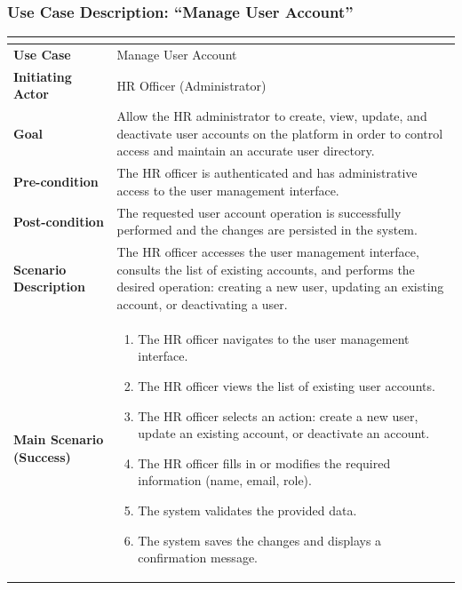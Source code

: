 \subsubsection{Use Case Description: ``Manage User Account''}

\setlength{\tabcolsep}{4pt}
\renewcommand{\arraystretch}{1.6}
\begin{table}[H]
\centering
\small
\begin{tabularx}{\textwidth}{|>{\bfseries\arraybackslash}p{4cm}|X|}
\hline
\rowcolor{headerblue}
\multicolumn{2}{|c|}{\textbf{Use Case: Manage User Account}} \\
\hline
Use Case            & Manage User Account \\
\hline
Initiating Actor    & HR Officer (Administrator) \\
\hline
Goal                & Allow the HR administrator to create, view, update, and deactivate user accounts on the platform in order to control access and maintain an accurate user directory. \\
\hline
Pre-condition       & The HR officer is authenticated and has administrative access to the user management interface. \\
\hline
Post-condition      & The requested user account operation is successfully performed and the changes are persisted in the system. \\
\hline
Scenario Description &
The HR officer accesses the user management interface, consults the list of existing accounts, and performs the desired operation: creating a new user, updating an existing account, or deactivating a user. \\
\hline
Main Scenario (Success) &
\begin{enumerate}[leftmargin=*, label=\arabic*., topsep=0pt, itemsep=0pt]
    \item The HR officer navigates to the user management interface.
    \item The HR officer views the list of existing user accounts.
    \item The HR officer selects an action: create a new user, update an existing account, or deactivate an account.
    \item The HR officer fills in or modifies the required information (name, email, role).
    \item The system validates the provided data.
    \item The system saves the changes and displays a confirmation message.
\end{enumerate} \\

\end{tabularx}
\end{table}
